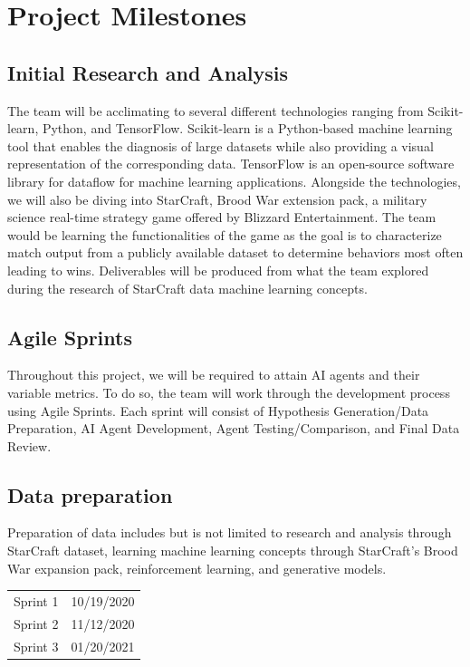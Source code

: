 \documentclass[a4paper,12pt]{report}
\begin{document}
\section{Project Milestones}

\subsection{Initial Research and Analysis}

The team will be acclimating to several different technologies ranging from Scikit-learn, Python, and TensorFlow. Scikit-learn is a Python-based machine learning tool that enables the diagnosis of large datasets while also providing a visual representation of the corresponding data. TensorFlow is an open-source software library for dataflow for machine learning applications. Alongside the technologies, we will also be diving into StarCraft, Brood War extension pack, a military science real-time strategy game offered by Blizzard Entertainment. The team would be learning the functionalities of the game as the goal is to characterize match output from a publicly available dataset to determine behaviors most often leading to wins. Deliverables will be produced from what the team explored during the research of StarCraft data machine learning concepts.

\subsection{Agile Sprints}

Throughout this project, we will be required to attain AI agents and their variable metrics. To do so, the team will work through the development process using Agile Sprints. Each sprint will consist of Hypothesis Generation/Data Preparation, AI Agent Development, Agent Testing/Comparison, and Final Data Review.

\subsection{Data preparation}

Preparation of data includes but is not limited to research and analysis through StarCraft dataset, learning machine learning concepts through StarCraft’s Brood War expansion pack, reinforcement learning, and generative models.

\begin{center}\begin{tabular}{ll}
Sprint 1 & 10/19/2020 \\
Sprint 2 & 11/12/2020 \\
Sprint 3 & 01/20/2021
\end{tabular}\end{center}
\end{document}
